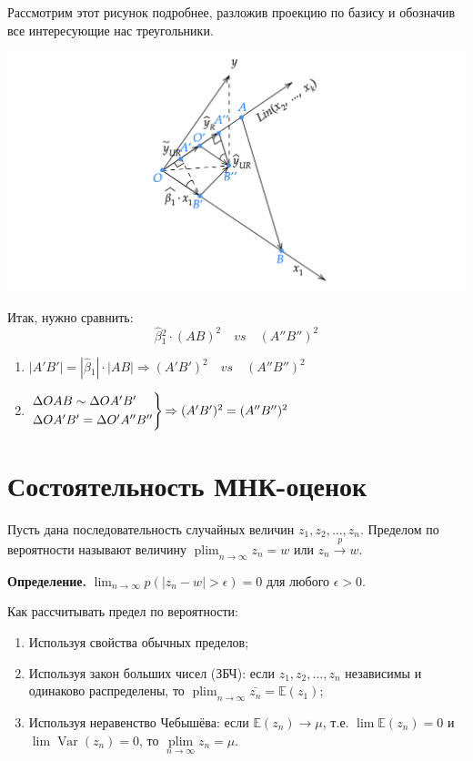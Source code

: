 \documentclass[12pt]{article} %
\theoremstyle{definition} %
\DeclareMathOperator{\Var}{Var}
\DeclareMathOperator{\plim}{plim}
\def \hb{\hat{\beta}}
\begin{document}
Рассмотрим этот рисунок подробнее, разложив проекцию по базису и обозначив все интересующие нас треугольники.

\includegraphics[width=0.8\linewidth]{images/10_picture2.png}


Итак, нужно сравнить:
\[ \hb{}_1^2 \cdot (AB)^2 \quad vs \quad  (A''B'')^2
\]

\begin{enumerate}
    \item $|A'B'| = |\hb{}_1|\cdot |AB| \Rightarrow  (A'B')^2 \quad vs \quad (A''B'')^2
    $
    \item

    $\begin{rcases}
    \Delta OAB \sim \Delta OA'B' \\
    \Delta OA'B' = \Delta O'A''B''
    \end{rcases}
    \text{$\Rightarrow (A'B')^2 = (A''B'')^2$}$
\end{enumerate}





\section{Состоятельность МНК-оценок}

Пусть дана последовательность случайных величин $z_1, z_2, \ldots, z_n$. Пределом по вероятности называют величину $\plim_{n\to\infty}{z_n} = w$ или $z_n \xrightarrow{p} w$.

\textbf{Определение.} $\lim_{n\to\infty}{p(|z_n - w| > \epsilon)}=0$ для любого $\epsilon > 0$.

Как рассчитывать предел по вероятности:
\begin{enumerate}
\item Используя свойства обычных пределов;

\item Используя закон больших чисел (ЗБЧ): если $z_1, z_2, \ldots, z_n$ независимы и одинаково распределены, то $\displaystyle \plim_{n\to\infty}{\bar{z_n}}=\mathbb{E}(z_1)$;

\item Используя неравенство Чебышёва: если $\mathbb{E}(z_n)\to\mu$, т.е. $\lim{\mathbb{E}(z_n)}=0$ и $\lim{\Var(z_n)}=0$, то $\displaystyle \plim\limits_{n\to\infty}{z_n}=\mu$.
\end{enumerate}
\end{document}
